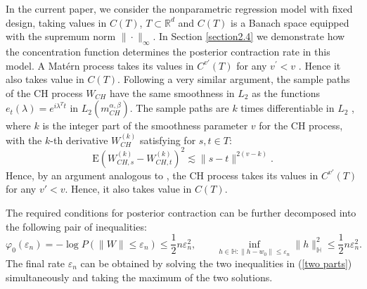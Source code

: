 \documentclass[ejs,noshowframe]{imsart}
\theoremstyle{plain}
\theoremstyle{definition}
\theoremstyle{remark}
\begin{document}
In the current paper, we consider the nonparametric  regression  model with fixed design, taking values in $C(T)$, $T\subset \mathbb{R}^d$ and $C(T)$ is a Banach space equipped with  the supremum norm $\|\cdot\|_{\infty}$. In Section \ref{section2.4} we demonstrate how the concentration function determines the posterior contraction rate in this model. A Mat\'ern process takes its values in $C^{v\prime}(T)$ for any $v^\prime < v$ \citep[p.~2104,][]{van2011information}. Hence it  also takes value in $C\left(T\right)$. Following a very similar argument, the sample paths of the CH process $W_{CH}$ have the same smoothness in $L_2$ as the functions $e_t(\lambda)=e^{i \lambda^T t}$ in $L_2(m^{\alpha,\beta}_{CH})$. The sample paths are $k$ times differentiable in $L_2$ \citep{ma2022beyond}, where $k$ is the integer part of the smoothness parameter $v$ for the CH process, with the $k$-th derivative $W^{(k)}_{CH}$ satisfying for $s,t\in T$:
$$
\mathrm{E}\left(W_{CH,s}^{(k)}-W_{CH,t}^{(k)}\right)^2 \lesssim\|s-t\|^{2(v-k)}.
$$
Hence, by an argument analogous to \citet{van2011information}, the CH process takes its values in $C^{{v}'}(T)$ for any ${v'}<v$. Hence, it  also takes value in $C\left(T\right)$.
 
The required conditions for posterior contraction can be further decomposed into  the following  pair of inequalities:
\begin{equation}
\varphi_0(\varepsilon_n)=-\log P(\| W\| \le \varepsilon_n) \le \frac{1}{2}n \varepsilon_n^2, \qquad
\inf_{h \in {\mathbb{H}}:\|h-w_0\|\le\varepsilon_n}\|h\|_{\mathbb{H}}^2 \le \frac{1}{2}n \varepsilon_n^2. \label{two parts}
\end{equation}
The final rate $\varepsilon_n$  can be obtained by  solving the two inequalities in (\ref{two parts}) simultaneously and taking the maximum of the two  solutions. 
\end{document}
